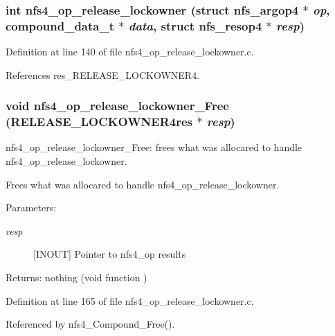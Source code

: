 \subsubsection{\setlength{\rightskip}{0pt plus 5cm}int nfs4\_\-op\_\-release\_\-lockowner (struct nfs\_\-argop4 $\ast$ {\em op}, compound\_\-data\_\-t $\ast$ {\em data}, struct nfs\_\-resop4 $\ast$ {\em resp})}\label{nfs4__op__release__lockowner_8c_a2}




Definition at line 140 of file nfs4\_\-op\_\-release\_\-lockowner.c.

References res\_\-RELEASE\_\-LOCKOWNER4.
\subsubsection{\setlength{\rightskip}{0pt plus 5cm}void nfs4\_\-op\_\-release\_\-lockowner\_\-Free (RELEASE\_\-LOCKOWNER4res $\ast$ {\em resp})}\label{nfs4__op__release__lockowner_8c_a3}


nfs4\_\-op\_\-release\_\-lockowner\_\-Free: frees what was allocared to handle nfs4\_\-op\_\-release\_\-lockowner.

Frees what was allocared to handle nfs4\_\-op\_\-release\_\-lockowner.

\begin{Desc}
\item[Parameters:]
\begin{description}
\item[{\em resp}][INOUT] Pointer to nfs4\_\-op results\end{description}
\end{Desc}
\begin{Desc}
\item[Returns:]nothing (void function ) \end{Desc}


Definition at line 165 of file nfs4\_\-op\_\-release\_\-lockowner.c.

Referenced by nfs4\_\-Compound\_\-Free().